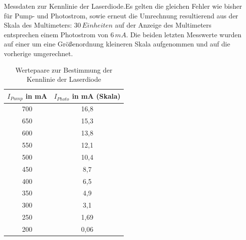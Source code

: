 \documentclass[twoside,colorback,accentcolor=tud4c,11pt]{tudreport}
\begin{document}
\newpage

Messdaten zur Kennlinie der Laserdiode.Es gelten die gleichen Fehler wie bisher für Pump- und Photostrom, sowie erneut die Umrechnung resultierend aus der Skala des Multimeters: $30\,\si{Einheiten}$ auf der Anzeige des Multimeters entsprechen einem Photostrom von $6\,\si{mA}$. Die beiden letzten Messwerte wurden auf einer um eine Größenordnung kleineren Skala aufgenommen und auf die vorherige umgerechnet.
\begin{table}[H]
\renewcommand*{\arraystretch}{1.2}
\centering
\begin{tabular}{|c|c|}
\hline 
$I_{Pump}$ in mA & $I_{Photo}$ in mA (Skala)\\
\hline 
700 & 16,8  \\ 
\hline 
650 & 15,3  \\ 
\hline 
600 & 13,8  \\ 
\hline 
550 & 12,1  \\ 
\hline 
500 & 10,4  \\ 
\hline
450 & 8,7 \\ 
\hline
400 & 6,5 \\ 
\hline
350 & 4,9 \\ 
\hline
300 & 3,1 \\ 
\hline
250 & 1,69 \\ 
\hline
200 & 0,06 \\ 
\hline
\end{tabular} 
\caption{Wertepaare zur Bestimmung der Kennlinie der Laserdiode}\label{kennd}
\end{table}
\end{document}
